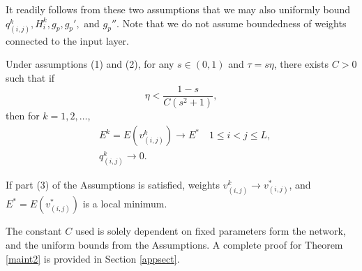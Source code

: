 \documentclass{jcmlatex}
\begin{document}
It readily follows from these two assumptions that we may also uniformly bound  $q_{(i,j)}^k, H_i^k,g_p, g_p',$ and  $g_p''$.  Note that we do not assume boundedness of weights connected to the input layer.

\begin{theorem}\label{maint2}
Under assumptions (1) and (2), for any $s \in (0,1)$ and  $\tau = s\eta$, there exists $C>0$ such that if 
\begin{equation}
\eta < \frac{1-s}{C(s^2+1)},
\end{equation}
then for $k = 1,2,\dots$, 
\begin{align}
&E^k = E(v_{(i,j)}^k ) \rightarrow E^* \quad 1\le i<j\le L,\\
&q^k_{(i,j)} \rightarrow 0.
\end{align}

If part (3) of the Assumptions is satisfied, weights $v_{(i,j)}^k\rightarrow v_{(i,j)}^*$, and $E^* = E(v_{(i,j)}^*)$ is a local  minimum.
\end{theorem}

The constant $C$ used is solely dependent on fixed parameters form the network, and the uniform bounds from the Assumptions. A complete proof for Theorem \ref{maint2} is provided in Section \ref{appsect}.

\end{document}
